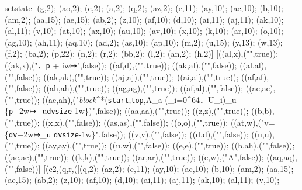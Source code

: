 setstate [(g,2); (ao,2); (c,2); (a,2); (q,2); (az,2); (e,11); (ay,10); (ac,10); (b,10); (am,2); (aa,15); (ae,15); (ab,2); (z,10); (af,10); (d,10); (ai,11); (aj,11); (ak,10); (al,11); (v,10); (at,10); (ax,10); (au,10); (av,10); (x,10); (k,10); (ar,10); (o,10); (ag,10); (ah,11); (aq,10); (ad,2); (as,10); (ap,10); (m,2); (u,15); (y,13); (w,13); (f,2); (ba,2); (p,22); (n,2); (r,2); (bb,2); (l,2); (an,2); (h,2)] [((al,x),("",true)); ((ak,x),("．{\tt p} + i{\sf w}↦\underscore",false)); ((af,d),("",true)); ((ak,al),("",false)); ((al,al),("",false)); ((ak,ak),("",true)); ((aj,aj),("",true)); ((ai,ai),("",true)); ((af,af),("",false)); ((ah,ah),("",true)); ((ag,ag),("",true)); ((af,al),("",false)); ((ae,ae),("",true)); ((ae,ah),("\emph{block}^*({\tt start},{\tt top},A_{\sf a} \uplus (\biguplus_{i=0}^{64}．U_i)_{\sf u} {}\\{} \uplus \{{\tt p}+2{\sf w}↦_{\sf u}{\tt dvsize}-1{\sf w}\})",false)); ((aa,aa),("",true)); ((z,z),("",true)); ((b,b),("",true)); ((x,x),("",false)); ((as,as),("",false)); ((o,o),("",true)); ((at,w),("v=\{{\tt dv}+2{\sf w}↦_{\sf u} {\tt dvsize}-1{\sf w}\}",false)); ((v,v),("",false)); ((d,d),("",false)); ((u,u),("",true)); ((ay,ay),("",true)); ((u,w),("",false)); ((e,e),("",true)); ((b,ah),("",false)); ((ac,ac),("",true)); ((k,k),("",true)); ((ar,ar),("",true)); ((e,w),("\state A",false)); ((aq,aq),("",false))] [(c2,(q,r,([(q,2); (az,2); (e,11); (ay,10); (ac,10); (b,10); (am,2); (aa,15); (ae,15); (ab,2); (z,10); (af,10); (d,10); (ai,11); (aj,11); (ak,10); (al,11); (v,10); 